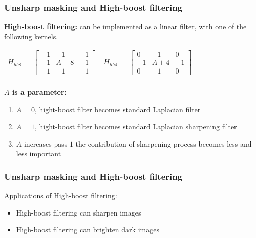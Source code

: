 \documentclass[english,11pt,table,handout]{beamer}
\begin{document}
{
	\frametitle{Unsharp masking and High-boost filtering}
	\textbf{High-boost filtering:}  can be implemented as a linear filter, with one of the following kernels.
	\newline
		\newline
	\centering
	\begin{tabular}{l||l}
		 \\
		$H_{hb8} = $ $\left[ 
		\begin{array}{rrr} 
		-1 & -1 & -1 \\
		-1 & A+8 & -1\\
		-1 & -1 & -1
		\end{array}\right] $ &
		$H_{hb4} = $ $\left[ 
		\begin{array}{rrr} 
		0 & -1 & 0 \\
		-1 & A+4 & -1\\
		0 & -1 & 0
		\end{array}\right] $ \\
		\\
	\end{tabular}
	\flushleft
	\textbf{$A$ is a parameter:}
	\begin{enumerate}
		\item  $A=0$, hight-boost filter becomes standard \alert{Laplacian filter}
		\item  $A=1$, hight-boost filter becomes standard \alert{Laplacian sharpening filter}
		\item $A$ increases pass $1$ the contribution of sharpening process becomes less and less important
	\end{enumerate}
}
\frame
{
	\frametitle{Unsharp masking and High-boost filtering}
	\begin{alertblock}{Applications of High-boost filtering:}
		\begin{itemize}
			\item  High-boost filtering can sharpen images
			\item  High-boost filtering can brighten dark images
		\end{itemize}
		
	\end{alertblock}	
}
\frame
\end{document}
